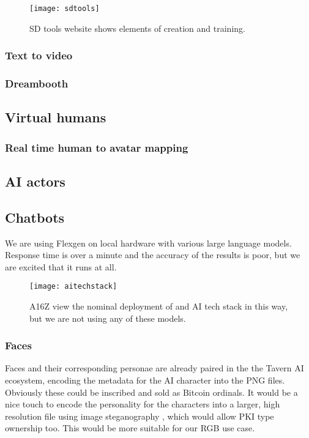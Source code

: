\begin{figure}
  \centering
    \texttt{[image: sdtools]}
  \caption{SD tools website shows elements of creation and training.}
  	\label{fig:SDTools}
\end{figure}
\subsubsection{Text to video}
\subsubsection{Dreambooth}


\subsection{Virtual humans}
\subsubsection{Real time human to avatar mapping}
\subsection{AI actors}
\subsection{Chatbots}
We are using Flexgen \cite{Sheng2023} on local hardware with various large language models. Response time is over a minute and the accuracy of the results is poor, but we are excited that it runs at all.

\begin{figure}
  \centering
    \texttt{[image: aitechstack]}
  \caption{A16Z view the nominal deployment of and AI tech stack in this way, but we are not using any of these models.}
  	\label{fig:aitechstack}
\end{figure}


\subsubsection{Faces}
Faces and their corresponding personae are already paired in the the Tavern AI ecosystem, encoding the metadata for the AI character into the PNG files. Obviously these could be inscribed and sold as Bitcoin ordinals. It would be a nice touch to encode the personality for the characters into a larger, high resolution file using image steganography \cite{morkel2005overview}, which would allow PKI type ownership too. This would be more suitable for our RGB use case. 
